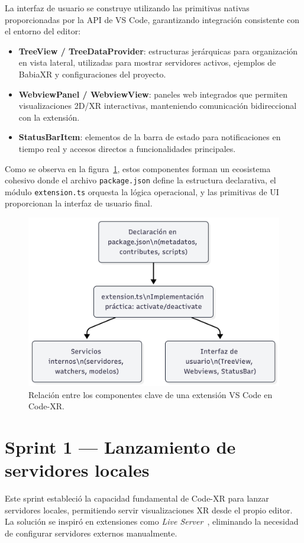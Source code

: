 \documentclass[a4paper, 12pt]{book}
\begin{document}
La interfaz de usuario se construye utilizando las primitivas nativas proporcionadas por la API de VS Code, garantizando integración consistente con el entorno del editor:

\begin{itemize}
  \item \textbf{TreeView / TreeDataProvider}: estructuras jerárquicas para organización en vista lateral, utilizadas para mostrar servidores activos, ejemplos de BabiaXR y configuraciones del proyecto.
  \item \textbf{WebviewPanel / WebviewView}: paneles web integrados que permiten visualizaciones 2D/XR interactivas, manteniendo comunicación bidireccional con la extensión.
  \item \textbf{StatusBarItem}: elementos de la barra de estado para notificaciones en tiempo real y accesos directos a funcionalidades principales.
\end{itemize}

Como se observa en la figura~\ref{fig:extension-structure}, estos componentes forman un ecosistema cohesivo donde el archivo \texttt{package.json} define la estructura declarativa, el módulo \texttt{extension.ts} orquesta la lógica operacional, y las primitivas de UI proporcionan la interfaz de usuario final.

\begin{figure}[H]
\centering
\includegraphics[width=0.60\linewidth]{img/fig-extension-structure.png}
\caption{Relación entre los componentes clave de una extensión VS Code en Code-XR.}
\label{fig:extension-structure}
\end{figure}


\section{Sprint 1 — Lanzamiento de servidores locales}
\label{sec:sprint-servers}

Este sprint estableció la capacidad fundamental de Code-XR para lanzar servidores locales, permitiendo servir visualizaciones XR desde el propio editor. La solución se inspiró en extensiones como \emph{Live Server}~\cite{liveserver}, eliminando la necesidad de configurar servidores externos manualmente.
\end{document}

